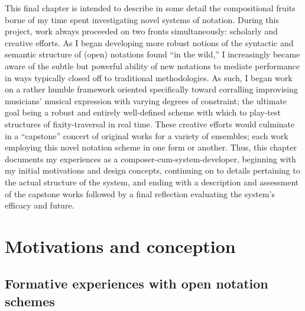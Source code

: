 
    This final chapter is intended to describe in some detail the compositional fruits borne of my time spent investigating novel systems of notation. During this project, work always proceeded on two fronts simultaneously: scholarly and creative efforts. As I began developing more robust notions of the syntactic and semantic structure of (open) notations found ``in the wild,'' I increasingly became aware of the subtle but powerful ability of new notations to mediate performance in ways typically closed off to traditional methodologies. As such, I began work on a rather humble framework oriented specifically toward corralling improvising musicians' musical expression with varying degrees of constraint; the ultimate goal being a robust and entirely well-defined scheme with which to play-test structures of fixity-traversal in real time. These creative efforts would culminate in a ``capstone'' concert of original works for a variety of ensembles; each work employing this novel notation scheme in one form or another. Thus, this chapter documents my experiences as a composer-cum-system-developer, beginning with my initial motivations and design concepts, continuing on to details pertaining to the actual structure of the system, and ending with a description and assessment of the capstone works followed by a final reflection evaluating the system's efficacy and future.

\section{Motivations and conception}
    \subsection{Formative experiences with open notation schemes}


